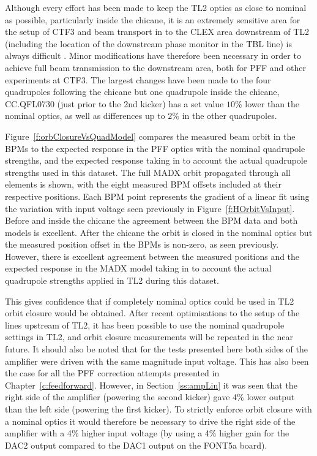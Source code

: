 Although every effort has been made to keep the TL2 optics as close to nominal as possible, particularly inside the chicane, it is an extremely sensitive area for the setup of CTF3 and beam transport in to the CLEX area downstream of TL2 (including the location of the downstream phase monitor in the TBL line) is always difficult \cite{piotrPriv}. Minor modifications have therefore been necessary in order to achieve full beam transmission to the downstream area, both for PFF and other experiments at CTF3. The largest changes have been made to the four quadrupoles following the chicane but one quadrupole inside the chicane, CC.QFL0730 (just prior to the 2nd kicker) has a set value \(10\%\) lower than the nominal optics, as well as differences up to \(2\%\) in the other quadrupoles. 

Figure~\ref{f:orbClosureVsQuadModel} compares the measured beam orbit
 in the BPMs to the expected response in the PFF optics with the 
 nominal quadrupole strengths, and the expected response taking in to
 account the actual quadrupole strengths used in this dataset.
 The full MADX orbit propagated through all elements is shown, with the eight measured BPM offsets included at their respective positions. 
 Each BPM point represents the gradient of a linear fit using the variation with input voltage seen previously in Figure~\ref{f:HOrbitVsInput}.
 Before and inside the chicane the agreement between the BPM data and both models is excellent.
  After the chicane the orbit is closed in the nominal optics but the 
  measured position offset in the BPMs is non-zero, as seen previously.
  However, there is excellent agreement between the measured positions
  and the expected response in the MADX model taking in to account the 
  actual quadrupole strengths applied in TL2 during this dataset.

This gives confidence that if completely nominal optics could be 
used in TL2 orbit closure would be obtained. 
After recent optimisations to the setup of the lines upstream of TL2, it has been possible to use the nominal quadrupole settings in TL2, and orbit closure measurements will be repeated in the near future.
It should also be 
noted that for the tests presented here both sides of the amplifier were driven with the same magnitude input voltage. This has also been the case for 
all the PFF correction attempts presented in Chapter~\ref{c:feedforward}. 
However, in Section~\ref{ss:ampLin} it was seen that the right side of the amplifier (powering the second kicker) gave 4\% lower output than the left side (powering the first kicker).
To strictly enforce orbit closure with a nominal optics it would 
therefore be necessary to drive the right side of the amplifier with 
a 4\% higher input voltage (by using a 4\% higher gain for the DAC2 
output compared to the DAC1 output on the FONT5a board).



